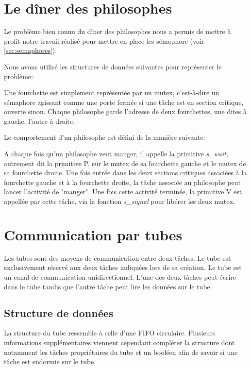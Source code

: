 
\section{Le dîner des philosophes}
Le problème bien connu du dîner des philosophes nous a permis de mettre à profit notre travail réalisé pour mettre en place les sémaphore (voir \ref{sec:semaphores}).

Nous avons utilisé les structures de données suivantes pour représenter le problème:

Une fourchette est simplement représentée par un mutex, c'est-à-dire un sémaphore agissant comme une porte fermée si une tâche est en section critique, ouverte sinon. Chaque philosophe garde l'adresse de deux fourchettes, une dites à gauche, l'autre à droite.

Le comportement d'un philosophe est défini de la manière suivante:

A chaque fois qu'un philosophe veut manger, il appelle la primitive \textit{s\_wait}, autrement dit la primitive P, sur le mutex de sa fourchette gauche et le mutex de sa fourchette droite. Une fois entrée dans les deux sections critiques associées à la fourchette gauche et à la fourchette droite, la tâche associée au philosophe peut lancer l'activité de "manger". Une fois cette activité terminée, la primitive V est appellée par cette tâche, via la fonction \textit{s\_signal} pour libérer les deux mutex.

\section{Communication par tubes}
Les tubes sont des moyens de communication entre deux tâches. Le tube est exclusivement réservé aux deux tâches indiquées lors de sa création.
Le tube est un canal de communication unidirectionnel. L'une des deux tâches peut écrire dans le tube tandis que l'autre tâche peut lire les données sur le tube.

\subsection{Structure de données}
La structure du tube ressemble à celle d'une FIFO circulaire. Plusieurs informations supplémentaires viennent cependant compléter la structure dont notamment les tâches propriétaires du tube et un booléen afin de savoir si une tâche est endormie sur le tube.


